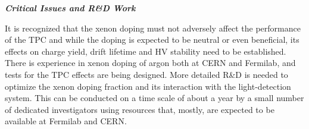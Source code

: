 

{\it\bf Critical Issues and R\&D Work}

It is recognized that the xenon doping must not adversely affect the performance of the TPC and while the doping is expected to be neutral or even beneficial, its effects on charge yield, drift lifetime and HV stability need to be established.  There is experience in xenon doping of argon both at CERN and Fermilab, and tests for the TPC effects are being designed.  
More detailed R\&D is needed to optimize the xenon doping fraction and its interaction with the light-detection system. This can be conducted on a time scale of about a year by a small number of dedicated investigators using resources that, mostly, are expected to be available at Fermilab and CERN. 

